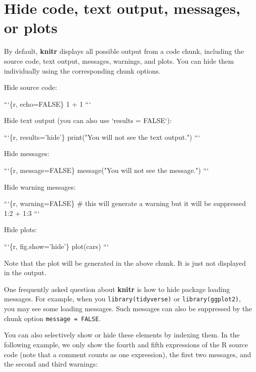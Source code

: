 \documentclass[
  11pt,
]{krantz}
\newenvironment{Shaded}{\begin{snugshade}}{\end{snugshade}}
\newcommand{\BaseNTok}[1]{\textcolor[rgb]{0.06,0.06,0.06}{#1}}
\newcommand{\NormalTok}[1]{#1}
\begin{document}
\hypertarget{hide-one}{%
\section{Hide code, text output, messages, or plots}\label{hide-one}}

By default, \textbf{knitr} displays all possible output from a code chunk, including the source code, text output, messages, warnings, and plots. You can hide them individually using the corresponding chunk options.

\begin{Shaded}
\begin{Highlighting}[]
\NormalTok{Hide source code:}

\BaseNTok{```\{r, echo=FALSE\}}
\BaseNTok{1 + 1}
\BaseNTok{```}

\NormalTok{Hide text output (you can also use }\BaseNTok{`results = FALSE`}\NormalTok{):}

\BaseNTok{```\{r, results='hide'\}}
\BaseNTok{print("You will not see the text output.")}
\BaseNTok{```}

\NormalTok{Hide messages:}

\BaseNTok{```\{r, message=FALSE\}}
\BaseNTok{message("You will not see the message.")}
\BaseNTok{```}

\NormalTok{Hide warning messages:}

\BaseNTok{```\{r, warning=FALSE\}}
\BaseNTok{# this will generate a warning but it will be suppressed}
\BaseNTok{1:2 + 1:3}
\BaseNTok{```}

\NormalTok{Hide plots:}

\BaseNTok{```\{r, fig.show='hide'\}}
\BaseNTok{plot(cars)}
\BaseNTok{```}

\NormalTok{Note that the plot will be generated in the above chunk. It is}
\NormalTok{just not displayed in the output.}
\end{Highlighting}
\end{Shaded}

One frequently asked question about \textbf{knitr} is how to hide package loading messages. For example, when you \texttt{library(tidyverse)} or \texttt{library(ggplot2)}, you may see some loading messages. Such messages can also be suppressed by the chunk option \texttt{message\ =\ FALSE}.

You can also selectively show or hide these elements by indexing them. In the following example, we only show the fourth and fifth expressions of the R source code (note that a comment counts as one expression), the first two messages, and the second and third warnings:
\end{document}
